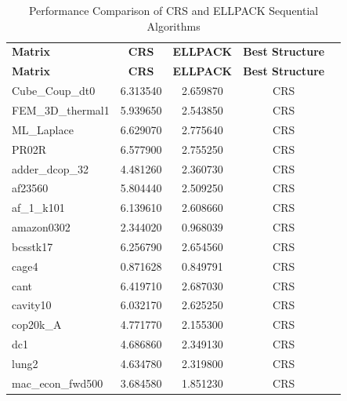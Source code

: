 \documentclass[12pt,oneside]{book} %
\begin{document}
\begin{longtable}{lcccr}
    \label{tab:sequential}                                                        \\
    \caption{Performance Comparison of CRS and ELLPACK Sequential Algorithms}     \\
    \toprule
    \textbf{Matrix}   & \textbf{CRS} & \textbf{ELLPACK} & \textbf{Best Structure} \\
    \midrule
    \endfirsthead
    \toprule
    \textbf{Matrix}   & \textbf{CRS} & \textbf{ELLPACK} & \textbf{Best Structure} \\
    \midrule
    \endhead
    \bottomrule
    \endfoot
    Cube\_Coup\_dt0   & 6.313540     & 2.659870         & CRS                     \\
    FEM\_3D\_thermal1 & 5.939650     & 2.543850         & CRS                     \\
    ML\_Laplace       & 6.629070     & 2.775640         & CRS                     \\
    PR02R             & 6.577900     & 2.755250         & CRS                     \\
    adder\_dcop\_32   & 4.481260     & 2.360730         & CRS                     \\
    af23560           & 5.804440     & 2.509250         & CRS                     \\
    af\_1\_k101       & 6.139610     & 2.608660         & CRS                     \\
    amazon0302        & 2.344020     & 0.968039         & CRS                     \\
    bcsstk17          & 6.256790     & 2.654560         & CRS                     \\
    cage4             & 0.871628     & 0.849791         & CRS                     \\
    cant              & 6.419710     & 2.687030         & CRS                     \\
    cavity10          & 6.032170     & 2.625250         & CRS                     \\
    cop20k\_A         & 4.771770     & 2.155300         & CRS                     \\
    dc1               & 4.686860     & 2.349130         & CRS                     \\
    lung2             & 4.634780     & 2.319800         & CRS                     \\
    mac\_econ\_fwd500 & 3.684580     & 1.851230         & CRS                     \\

\end{longtable}
\end{document}
